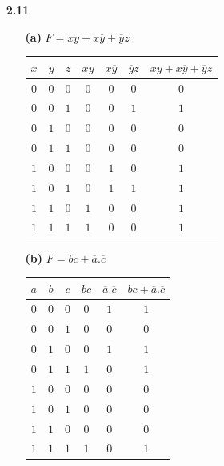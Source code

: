 \documentclass{article}
\begin{document}
\begin{itemize}
	\item [\textbf{2.11}]
	\begin{itemize}
		\item [\textbf{(a)}] $F = xy + x\overline{y} + \overline{y}z$\\
		\begin{tabular}{c | c | c | c | c | c | c}
		$x$ & $y$ & $z$ & $xy$ & $x\overline{y}$ & $\overline{y}z$ & $xy + x\overline{y} + \overline{y}z$\\ \hline
		$0$ & $0$ & $0$ & $0$ & $0$ & $0$ & $0$ \\
		$0$ & $0$ & $1$ & $0$ & $0$ & $1$ & $1$ \\
		$0$ & $1$ & $0$ & $0$ & $0$ & $0$ & $0$ \\
		$0$ & $1$ & $1$ & $0$ & $0$ & $0$ & $0$ \\
		$1$ & $0$ & $0$ & $0$ & $1$ & $0$ & $1$ \\
		$1$ & $0$ & $1$ & $0$ & $1$ & $1$ & $1$ \\
		$1$ & $1$ & $0$ & $1$ & $0$ & $0$ & $1$ \\
		$1$ & $1$ & $1$ & $1$ & $0$ & $0$ & $1$ \\
		\end{tabular}
		\item [\textbf{(b)}] $F = bc + \overline{a}.\overline{c}$\\
		\begin{tabular}{c | c | c | c | c | c}
		$a$ & $b$ & $c$ & $bc$ & $\overline{a}.\overline{c}$ & $bc + \overline{a}.\overline{c}$\\ \hline
		$0$ & $0$ & $0$ & $0$ & $1$ & $1$ \\
		$0$ & $0$ & $1$ & $0$ & $0$ & $0$ \\
		$0$ & $1$ & $0$ & $0$ & $1$ & $1$ \\
		$0$ & $1$ & $1$ & $1$ & $0$ & $1$ \\
		$1$ & $0$ & $0$ & $0$ & $0$ & $0$ \\
		$1$ & $0$ & $1$ & $0$ & $0$ & $0$ \\
		$1$ & $1$ & $0$ & $0$ & $0$ & $0$ \\
		$1$ & $1$ & $1$ & $1$ & $0$ & $1$ \\
		\end{tabular}
	\end{itemize}


\end{itemize}
\end{document}
